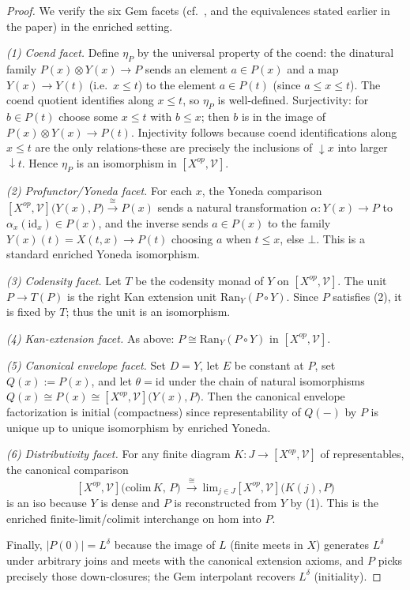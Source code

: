 \documentclass[11pt]{article}
\theoremstyle{plain}
\theoremstyle{definition}
\theoremstyle{remark}
\newcommand{\V}{\mathcal{V}}
\renewcommand{\lim}{\mathrm{lim}}
\begin{document}
\begin{proof}
We verify the six Gem facets (cf.\ \cite{kelly1982basic}, and the equivalences stated earlier in the paper) in the enriched setting.

\emph{(1) Coend facet.}
Define $\eta_P$ by the universal property of the coend: the dinatural family $P(x)\otimes Y(x)\to P$ sends an element $a\in P(x)$ and a map $Y(x)\to Y(t)$ (i.e.\ $x\le t$) to the element $a\in P(t)$ (since $a\le x\le t$). The coend quotient identifies along $x\le t$, so $\eta_P$ is well-defined. Surjectivity: for $b\in P(t)$ choose some $x\le t$ with $b\le x$; then $b$ is in the image of $P(x)\otimes Y(x)\to P(t)$. Injectivity follows because coend identifications along $x\le t$ are the only relations-these are precisely the inclusions of $\downarrow x$ into larger $\downarrow t$. Hence $\eta_P$ is an isomorphism in $[X^{op},\V]$.

\emph{(2) Profunctor/Yoneda facet.}
For each $x$, the Yoneda comparison
\(
[X^{op},\V]\big(Y(x),P\big)\xrightarrow{\ \cong\ } P(x)
\)
sends a natural transformation $\alpha:Y(x)\to P$ to $\alpha_x(\mathrm{id}_x)\in P(x)$, and the inverse sends $a\in P(x)$ to the family $Y(x)(t)=X(t,x)\to P(t)$ choosing $a$ when $t\le x$, else $\bot$. This is a standard enriched Yoneda isomorphism.

\emph{(3) Codensity facet.}
Let $T$ be the codensity monad of $Y$ on $[X^{op},\V]$. The unit $P\to T(P)$ is the right Kan extension unit $\mathrm{Ran}_Y(P\circ Y)$. Since $P$ satisfies (2), it is fixed by $T$; thus the unit is an isomorphism.

\emph{(4) Kan-extension facet.}
As above: $P \cong \mathrm{Ran}_Y(P\circ Y)$ in $[X^{op},\V]$.

\emph{(5) Canonical envelope facet.}
Set $D=Y$, let $E$ be constant at $P$, set $Q(x):=P(x)$, and let $\theta=\mathrm{id}$ under the chain of natural isomorphisms $Q(x)\cong P(x)\cong [X^{op},\V]\big(Y(x),P\big)$. Then the canonical envelope factorization is initial (compactness) since representability of $Q(-)$ by $P$ is unique up to unique isomorphism by enriched Yoneda.

\emph{(6) Distributivity facet.}
For any finite diagram $K:J\to [X^{op},\V]$ of representables, the canonical comparison
$$
[X^{op},\V]\big(\mathrm{colim}\,K,\,P\big)\ \xrightarrow{\ \cong\ }\ \lim_{j\in J}[X^{op},\V]\big(K(j),P\big)
$$
is an iso because $Y$ is dense and $P$ is reconstructed from $Y$ by (1). This is the enriched finite-limit/colimit interchange on hom into $P$.

Finally, $|P(0)|=L^\delta$ because the image of $L$ (finite meets in $X$) generates $L^\delta$ under arbitrary joins and meets with the canonical extension axioms, and $P$ picks precisely those down-closures; the Gem interpolant recovers $L^\delta$ (initiality).
\end{proof}
\end{document}
